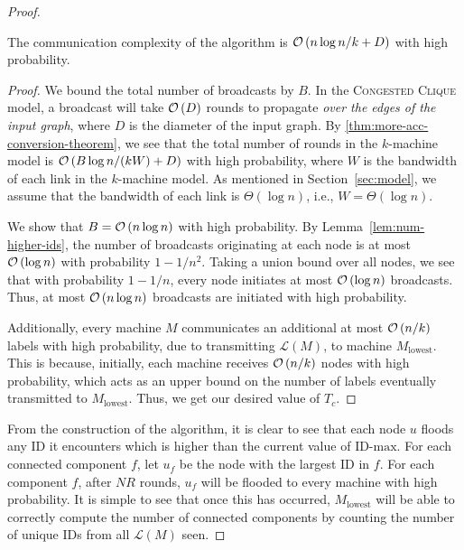 \begin{proof}
    \begin{lemma}
        \label{lem:flooding-tc}
    The communication complexity of the algorithm is $\mathcal{O}\left(n\log n/k + D\right)$ with high probability.
    \end{lemma}
    
    \begin{proof}
    We bound the total number of broadcasts by $B$. In the \textsc{Congested Clique} model, a broadcast will take $\mathcal{O}\left(D\right)$ rounds to propagate \emph{over the edges of the input graph}, where $D$ is the diameter of the input graph.
	By \cref{thm:more-acc-conversion-theorem}, we see that the total number of rounds in the $k$-machine model is $\mathcal{O}\left(B\log n/(kW) + D\right)$ with high probability, where $W$ is the bandwidth of each link in the $k$-machine model. As mentioned in Section~\ref{sec:model}, we assume that the bandwidth of each link is $\Theta(\log n)$, i.e., $W = \Theta(\log n)$.
    
    We show that $B = \mathcal{O}\left(n \log n\right)$ with high probability. 
    By Lemma~\ref{lem:num-higher-ids}, the number of broadcasts originating at each node is at most $\mathcal{O}\left(\log n\right)$ with probability $1 - 1/n^2$. 
    Taking a union bound over all nodes, we see that with probability $1 - 1/n$, every node initiates at most $\mathcal{O}\left(\log n\right)$ broadcasts. Thus, at most $\mathcal{O}\left(n \log n\right)$ broadcasts are initiated with high probability.
    
    Additionally, every machine $M$ communicates an additional at most $\mathcal{O}\left(n/k\right)$ labels with high probability, due to transmitting $\mathcal{L}(M)$, to machine $M_{\mathrm{lowest}}$. This is because, initially, each machine receives $\mathcal{O}\left(n/k\right)$ nodes with high probability, which acts as an upper bound on the number of labels eventually transmitted to $M_{\mathrm{lowest}}$. Thus, we get our desired value of $T_c$.
    \end{proof}
    
    From the construction of the algorithm, it is clear to see that each node $u$ floods any ID it encounters which is higher than the current value of $\textrm{ID-max}$. For each connected component $f$, let $u_f$ be the node with the largest ID in $f$. For each component $f$, after $NR$ rounds, $u_f$ will be flooded to every machine with high probability. It is simple to see that once this has occurred, $M_{\mathrm{lowest}}$ will be able to correctly compute the number of connected components by counting the number of unique IDs from all $\mathcal{L}(M)$ seen.
    \end{proof}
